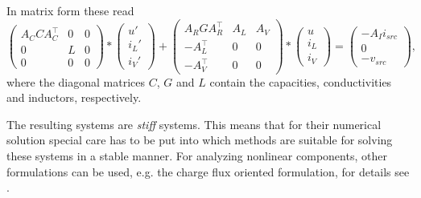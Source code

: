 In matrix form these read
\begin{equation}
	\label{MNA_Matrixform}
	\begin{pmatrix}
		A_C C A_C^\top & 0 & 0 \\
		0 & L & 0 \\
		0 & 0 & 0
	\end{pmatrix}
	*
	\begin{pmatrix}
		u' \\
		i_L' \\
		i_V'
	\end{pmatrix}
	+
	\begin{pmatrix}
		A_R G A_R^\top & A_L & A_V \\
		-A_L^\top & 0 & 0 \\
		-A_V^\top & 0 & 0 
	\end{pmatrix}
	*
	\begin{pmatrix}
		u \\
		i_L \\
		i_V
	\end{pmatrix}
	=
	\begin{pmatrix}
		-A_I i_{src} \\
		0 \\
		-v_{src}
	\end{pmatrix} , 
\end{equation}
where the diagonal matrices $C$, $G$ and $L$ contain the capacities, conductivities and inductors, respectively.

The resulting systems are \emph{stiff} systems. This means that for their numerical solution special care has to be put into which methods are suitable for solving these systems in a stable manner. For analyzing nonlinear components, other formulations can be used, e.g. the charge flux oriented formulation, for details see \cite{ModellingAndDiscretizationOfCircuitProblems}.


